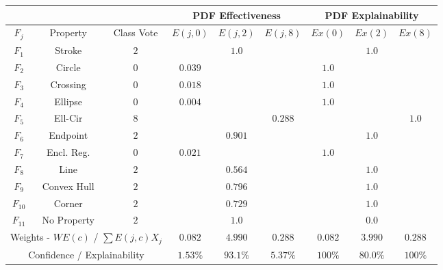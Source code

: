 \begin{table}[H]
        \renewcommand{\arraystretch}{1.3}
        \label{table:mnist_example2_ex}
        \centering
        \begin{tabular}{| c | c | c | c | c | c || c | c | c |}
        \cline{4-9}
        \multicolumn{3}{c}{} & \multicolumn{3}{|c||}{PDF Effectiveness} & \multicolumn{3}{c|}{PDF Explainability} \\
        \hline
        $F_j$ & Property & Class Vote & $E(j,0)$ & $E(j,2)$ & $E(j,8)$ & $Ex(0)$ & $Ex(2)$ & $Ex(8)$ \\
        \hline
        \hline
        $F_1$ & Stroke & $2$ &  & $1.0$ &  &  & $1.0$ & \\ 
        \hline
        $F_2$ & Circle & $0$ & $0.039$ &  &  & $1.0$ &  & \\
        \hline
        $F_3$ & Crossing & $0$ & $0.018$ &  &  & $1.0$ &  & \\
        \hline
        $F_4$ & Ellipse & $0$ & $0.004$ &  &  & $1.0$ &  & \\
        \hline
        $F_5$ & Ell-Cir & $8$ &  &  & $0.288$ &  &  & $1.0$ \\
        \hline
        $F_6$ & Endpoint & $2$ &  & $0.901$ &  &  & $1.0$ & \\
        \hline
        $F_7$ & Encl. Reg. & $0$ & $0.021$ &  &  & $1.0$ &  & \\
        \hline
        $F_8$ & Line & $2$ &  & $0.564$ &  &  & $1.0$ & \\
        \hline
        $F_9$& Convex Hull & $2$ &  & $0.796$ &  &  & $1.0$ & \\
        \hline
        $F_{10}$& Corner & $2$ &  & $0.729$ &  &  & $1.0$ & \\
        \hline
        $F_{11}$& No Property & $2$ &  & $1.0$ &  &  & $0.0$ & \\
        \hline
        \hline
        \multicolumn{3}{|c|}{Weights - $WE(c)$ / $\sum E(j,c)X_j$} & $0.082$ & $4.990$ & $0.288$ & $0.082$ & $3.990$ & $0.288$ \\
        \cline{0-8}
        \multicolumn{3}{|c|}{Confidence / Explainability} & $1.53\%$ & $93.1\%$ & $5.37\%$ & $100\%$ & $80.0\%$ & $100\%$ \\
        \cline{0-8}
        \end{tabular}
\end{table}

